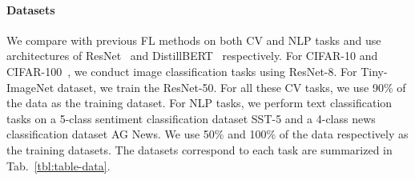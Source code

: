 \documentclass{article} %
\begin{document}
\paragraph{Datasets}

We compare with previous FL methods on both CV and NLP tasks and use architectures of ResNet~\citep{cvpr/HeZRS16} and DistillBERT~\citep{sanh2019distilbert} respectively. For CIFAR-10 and CIFAR-100~\citep{krizhevsky2009learning}, we conduct image classification tasks using ResNet-8. For Tiny-ImageNet dataset, we train the ResNet-50. For all these CV tasks, we use 90\% of the data as the training dataset. For NLP tasks, we perform text classification tasks on a 5-class sentiment classification dataset SST-5 and a 4-class news classification dataset AG News. We use 50\% and 100\% of the data respectively as the  training datasets. The datasets correspond to each task are summarized in Tab.~\ref{tbl:table-data}.



\end{document}
